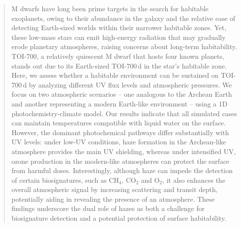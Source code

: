 \begin{abstract}

\noindent M dwarfs have long been prime targets in the search for habitable exoplanets, owing to their abundance in the galaxy and the relative ease of detecting Earth-sized worlds within their narrower habitable zones. Yet, these low-mass stars can emit high-energy radiation that may gradually erode planetary atmospheres, raising concerns about long-term habitability. TOI-700, a relatively quiescent M dwarf that hosts four known planets, stands out due to its Earth-sized TOI-700\,d in the star’s habitable zone.
Here, we assess whether a habitable environment can be sustained on TOI-700\,d by analyzing different UV flux levels and atmospheric pressures. We focus on two atmospheric scenarios -- one analogous to the Archean Earth and another representing a modern Earth-like environment -- using a 1D photochemistry-climate model. Our results indicate that all simulated cases can maintain temperatures compatible with liquid water on the surface. However, the dominant photochemical pathways differ substantially with UV levels: under low-UV conditions, haze formation in the Archean-like atmosphere provides the main UV shielding, whereas under intensified UV, ozone production in the modern-like atmospheres can protect the surface from harmful doses. Interestingly, although haze can impede the detection of certain biosignatures, such as CH$_4$, CO$_2$ and O$_2$, it also enhances the overall atmospheric signal by increasing scattering and transit depth, potentially aiding in revealing the presence of an atmosphere. These findings underscore the dual role of hazes as both a challenge for biosignature detection and a potential protection of surface habitability.

\end{abstract}


